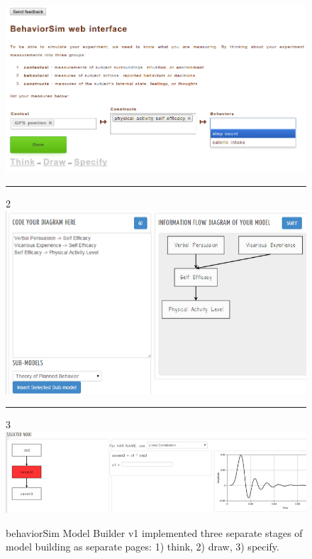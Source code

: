 \documentclass{sigchi}
\begin{document}
\begin{figure}[!t]
  \includegraphics[width=0.9\columnwidth]{img/v1-think}
  \rule{\columnwidth}{0.4pt}
  2
  \includegraphics[width=0.9\columnwidth]{img/v1-draw}
  \rule{\columnwidth}{0.4pt}
  3
  \includegraphics[width=0.9\columnwidth]{img/v1-specify}  
  \caption{behaviorSim Model Builder v1 implemented three separate stages of model building as separate pages: 1) think, 2) draw, 3) specify.}
  \label{model-builder-v1}
\end{figure}
\end{document}
